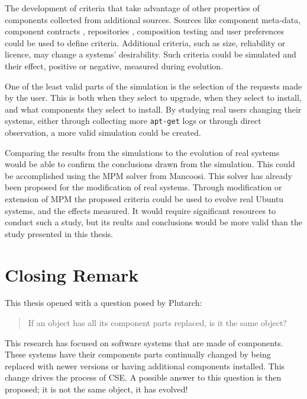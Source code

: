 The development of criteria that take advantage of other properties of components collected from additional sources.
Sources like component meta-data, component contracts \citep{Watkins1999}, repositories \citep{Guo2000}, 
composition testing \citep{XuejieZhang2008} and user preferences could be used to define criteria.
Additional criteria, such as size, reliability or licence, may change a systems' desirability.
Such criteria could be simulated and their effect, positive or negative, measured during evolution.

One of the least valid parts of the simulation is the selection of the requests made by the user.
This is both when they select to upgrade, when they select to install, and what components they select to install.
By studying real users changing their systems, either through collecting more \texttt{apt-get} logs or through direct observation,
a more valid simulation could be created.

Comparing the results from the simulations to the evolution of real systems would be able to confirm the conclusions drawn from the simulation.
This could be accomplished using the MPM solver \citep{abate2011} from Mancoosi.
This solver has already been proposed for the modification of real systems.
Through modification or extension of MPM the proposed criteria could be used to evolve real Ubuntu systems, and the effects measured.
It would require significant resources to conduct such a study, but its reults and conclusions would be more valid than the study presented in this thesis.    

\section{Closing Remark}
This thesis opened with a question posed by Plutarch:
\begin{quote}
If an object has all its component parts replaced, is it the same object?
\end{quote}
This research has focused on software systems that are made of components.
These systems have their components parts continually changed by being replaced with newer versions or having additional components installed.
This change drives the process of CSE.
A possible answer to this question is then proposed; it is not the same object, it has evolved!

